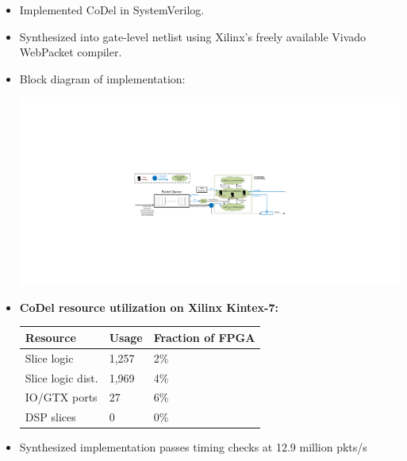 {\begin{multicols}{2}
\begin{itemize}
\item Implemented CoDel in SystemVerilog.
\item Synthesized into gate-level netlist using Xilinx's freely available Vivado WebPacket compiler.
\item Block diagram of implementation:
\\
\begin{center}
\includegraphics[width=\columnwidth]{codel.pdf}
\end{center}
\item \textbf{CoDel resource utilization on Xilinx Kintex-7:}\\
\begin{center}
\begin{tabular}{|l|l|l|}
\hline
\bf Resource & \bf Usage & \bf Fraction of FPGA \\
\hline Slice logic & 1,257 & 2\% \\
\hline Slice logic dist. & 1,969 & 4\% \\
\hline IO/GTX ports & 27 & 6\% \\
\hline DSP slices & 0 & 0\% \\
\hline
\end{tabular}
\end{center}
\item Synthesized implementation passes timing checks at 12.9 million pkts/s

\end{itemize}


\end{multicols}}
